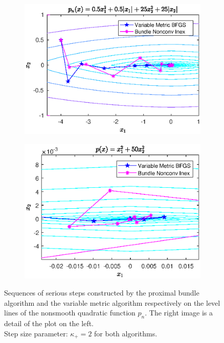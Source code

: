 \begin{figure}[H]
	\begin{subfigure}[t]{0.49\textwidth}
		\includegraphics[width=\textwidth]{Pictures/Plots/final_nonsm_parab.eps}
	\end{subfigure}
	\begin{subfigure}[t]{0.49\textwidth}
			\includegraphics[width=\textwidth]{Pictures/Plots/final_nonsm_parab_detail.eps}
	\end{subfigure}
	\caption[Serious steps on nonsmooth quadratic]{Sequences of serious steps constructed by the proximal bundle algorithm and the variable metric algorithm respectively on the level lines of the nonsmooth quadratic function \(p_n\). The right image is a detail of the plot on the left.\\
	Step size parameter: \(\kappa_+ = 2\) for both algorithms.}
	\label{fig_contour_nonsm_parab}
\end{figure}

